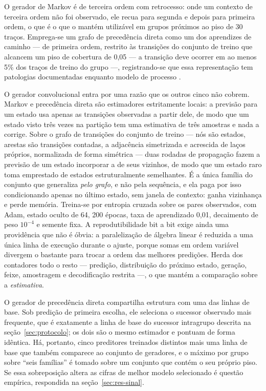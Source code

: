 O gerador de
Markov é de terceira ordem com retrocesso: onde um contexto de terceira ordem não foi observado, ele
recua para segunda e depois para primeira ordem, o que é o que o mantém utilizável em grupos
próximos ao piso de 30 traços. Emprega-se um grafo de precedência direta como um dos aprendizes de
caminho --- de primeira ordem, restrito às transições do conjunto de treino que alcancem um piso de
cobertura de 0{,}05 --- a transição deve ocorrer em ao menos 5\% dos traços de treino do grupo ---,
registrando-se que essa representação tem patologias documentadas enquanto modelo de
processo \cite{vanderaalst2019dfg}.

O gerador convolucional entra por uma razão que os outros cinco não cobrem. Markov e precedência
direta são estimadores estritamente locais: a previsão para um estado usa apenas as transições
observadas a partir dele, de modo que um estado visto três vezes na partição tem uma estimativa de
três amostras e nada a corrige. Sobre o grafo de transições do conjunto de treino --- nós são
estados, arestas são transições contadas, a adjacência simetrizada e acrescida de laços próprios,
normalizada de forma simétrica --- duas rodadas de propagação fazem a previsão de um estado
incorporar a de seus vizinhos, de modo que um estado raro toma emprestado de estados
estruturalmente semelhantes. É a única família do conjunto que generaliza \emph{pelo grafo}, e não
pela sequência, e ela paga por isso condicionando apenas no último estado, sem janela de contexto:
ganha vizinhança e perde memória. Treina-se por entropia cruzada sobre os pares observados, com
Adam, estado oculto de 64, 200 épocas, taxa de aprendizado 0,01, decaimento de peso $10^{-4}$ e
semente fixa. A reprodutibilidade bit a bit exige ainda uma providência que não é óbvia: a
paralelização de álgebra linear é reduzida a uma única linha de execução durante o ajuste, porque
somas em ordem variável divergem o bastante para trocar a ordem das melhores predições. Herda dos
contadores todo o resto --- predição, distribuição do próximo estado, geração, feixe, amostragem e
decodificação restrita ---, o que mantém a comparação sobre a \emph{estimativa}.

O gerador de precedência direta compartilha estrutura com uma das linhas de base. Sob predição de
primeira escolha, ele seleciona o sucessor observado mais frequente, que é exatamente a linha de
base do sucessor intragrupo descrita na seção~\ref{sec:protocolo}; os dois são o mesmo estimador e
pontuam de forma idêntica. Há, portanto, cinco preditores treinados distintos mais uma linha de
base que também
comparece ao conjunto de geradores, e o máximo por grupo sobre ``seis famílias'' é tomado sobre um
conjunto que contém o seu próprio piso. Se essa sobreposição altera as cifras de melhor modelo
selecionado é questão empírica, respondida na seção~\ref{sec:res-sinal}.

